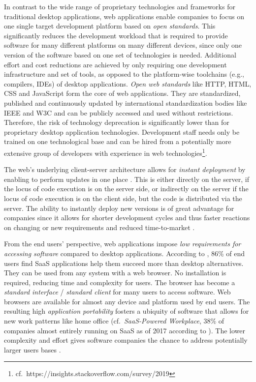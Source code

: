 In contrast to the wide range of proprietary technologies and frameworks for traditional desktop applications, web applications enable companies to focus on one single target development platform based on \emph{open standards}.
This significantly reduces the development workload that is required to provide software for many different platforms on many different devices, since only one version of the software based on one set of technologies is needed.
Additional effort and cost reductions are achieved by only requiring one development infrastructure and set of tools, as opposed to the platform-wise toolchains (e.g., compilers, IDEs) of desktop applications.
\emph{Open web standards} like HTTP, HTML, CSS and JavaScript form the core of web applications.
They are standardized, published and continuously updated by international standardization bodies like IEEE and W3C and can be publicly accessed and used without restrictions.
Therefore, the risk of technology deprecation is significantly lower than for proprietary desktop application technologies.
Development staff needs only be trained on one technological base and can be hired from a potentially more extensive group of developers with experience in web technologies\footnote{cf.~https://insights.stackoverflow.com/survey/2019}.

The web's underlying client-server architecture allows for \emph{instant deployment} by enabling to perform updates in one place \autocite{Gitzel2007WebEngineeringMDD}.
This is either directly on the server, if the locus of code execution is on the server side, or indirectly on the server if the locus of code execution is on the client side, but the code is distributed via the server.
The ability to instantly deploy new versions is of great advantage for companies since it allows for shorter development cycles and thus faster reactions on changing or new requirements and reduced time-to-market \autocite{Khadka2014ProfessionalsModernization,Fowley2017CloudSME}.

From the end users' perspective, web applications impose \emph{low requirements for accessing software} compared to desktop applications.
According to \autocite{BetterCloud2017SaaSWorkplace}, 86\% of end users find SaaS applications help them succeed more than desktop alternatives.
They can be used from any system with a web browser.
No installation is required, reducing time and complexity for users.
The browser has become a \emph{standard interface} \autocite{Aversano2001} / \emph{standard client} \autocite{Gitzel2007WebEngineeringMDD} for many users to access software.
Web browsers are available for almost any device and platform used by end users.
The resulting high \emph{application portability} \autocite{Gitzel2007WebEngineeringMDD} fosters a ubiquity of software that allows for new work patterns like home office \autocite{Bitkom2013Arbeit30} (cf.~\emph{SaaS-Powered Workplace}, 38\% of companies almost entirely running on SaaS as of 2017 according to \autocite{BetterCloud2017SaaSWorkplace}).
The lower complexity and effort gives software companies the chance to address potentially larger users bases \autocite{ForresterResearch2011Modernization}.

